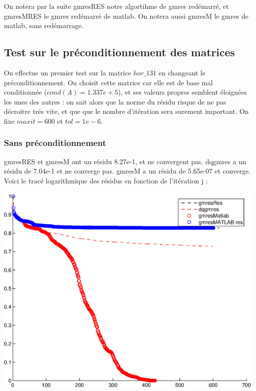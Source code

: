 On notera par la suite gmresRES notre algortihme de gmres redémarré, et gmresMRES le gmres redémarré de matlab. On notera aussi gmresM le gmres de matlab, sans redémarrage.

\subsection{Test sur le préconditionnement des matrices}
On effectue un premier test sur la matrice $hor\_131$ en changeant le préconditionnement. On choisit cette matrice car elle est de base mal conditionnée ($cond(A) = 1.337e+5$), et ses valeurs propres semblent éloignées les unes des autres : on sait alors que la norme du résidu risque de ne pas décroitre trés vite, et que que le nombre d'itération sera surement important. On fixe $maxit = 600$ et $tol = 1e-6$. 
\subsubsection*{Sans préconditionnement}

gmresRES et gmresM ont un résidu 8.27e-1, et ne convergent pas. dqgmres a un résidu de 7.04e-1 et ne converge pas. gmresM a un résidu de 5.65e-07 et converge. Voici le tracé logarithmique des résidus en fonction de l'itération j :
\begin{center}
\includegraphics[scale=0.65]{sanspre.eps}
\end{center}

